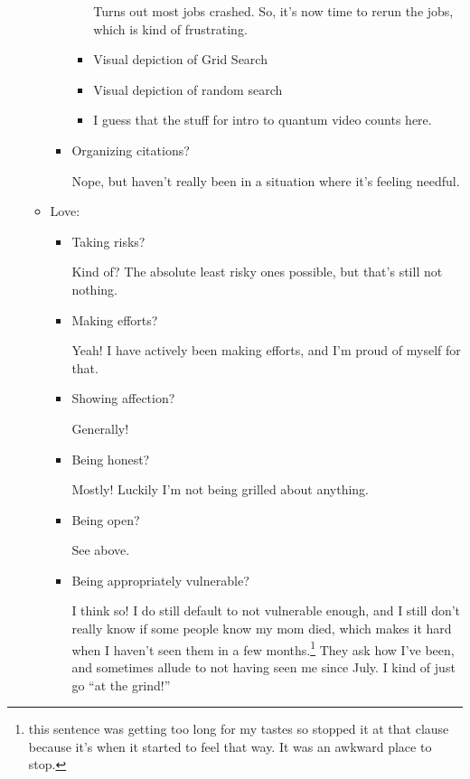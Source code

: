 \documentclass[12pt]{article}
\newcommand{\say}[1]{``#1''}
\renewcommand{\,}{\textsuperscript{,}}
\begin{document}
\begin{enumerate}
\begin{itemize}
\begin{itemize}
\begin{itemize}
Turns out most jobs crashed.  
So, it's now time to rerun the jobs, which is kind of frustrating.

\end{itemize}

\begin{itemize}

\item Visual depiction of Grid Search

\item Visual depiction of random search

\item I guess that the stuff for intro to quantum video counts here.

\end{itemize}

\item Organizing citations?

Nope, but haven't really been in a situation where it's feeling needful.

\end{itemize}

\item Love:

\begin{itemize}

\item Taking risks?

Kind of? The absolute least risky ones possible, but that's still not nothing.

\item Making efforts?

Yeah! I have actively been making efforts, and I'm proud of myself for that.

\item Showing affection?

Generally!

\item Being honest?

Mostly! Luckily I'm not being grilled about anything.

\item Being open?

See above.

\item Being appropriately vulnerable?

I think so! I do still default to not vulnerable enough, and I still don't really know if some people know my mom died, which makes it hard when I haven't seen them in a few months.\footnote{this sentence was getting too long for my tastes so stopped it at that clause because it's when it started to feel that way. It was an awkward place to stop.}  
They ask how I've been, and sometimes allude to not having seen me since July.  
I kind of just go \say{at the grind!}


\end{itemize}
\end{itemize}
\end{enumerate}
\end{document}
